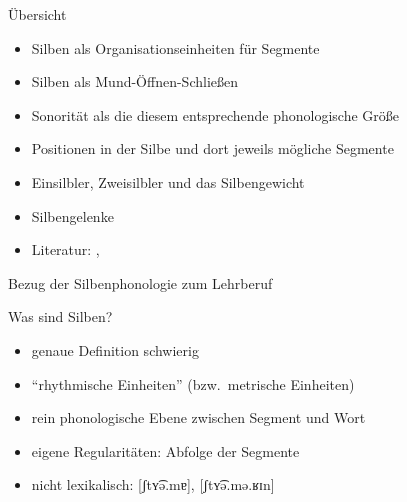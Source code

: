 \begin{frame}
  {Übersicht}
  \pause
  \begin{itemize}[<+->]
    \item Silben als Organisationseinheiten für Segmente
    \item Silben als Mund-Öffnen-Schließen
    \item \alert{Sonorität} als die diesem entsprechende phonologische Größe
    \item Positionen in der Silbe und dort jeweils mögliche Segmente
    \item Einsilbler, Zweisilbler und das \alert{Silbengewicht}
    \item \alert{Silbengelenke}
      \Zeile
    \item Literatur: , \citet{Maas2002}
  \end{itemize}
\end{frame}


\begin{frame}
  {Bezug der Silbenphonologie zum Lehrberuf}
  \pause
  \centering
  \LARGE
\end{frame}


\begin{frame}
  {Was sind Silben?}
  \pause
  \begin{itemize}[<+->]
    \item genaue Definition schwierig
    \item "`rhythmische Einheiten"' (bzw.\ metrische Einheiten)
      \Zeile
    \item \alert{rein phonologische} Ebene \alert{zwischen Segment und Wort}
    \item eigene \alert{Regularitäten}: Abfolge der Segmente
      \Zeile
    \item \alert{nicht lexikalisch}: [ʃtʏ͡ə.mɐ], [ʃtʏ͡ə.mə.ʁɪn]
  \end{itemize}
\end{frame}


